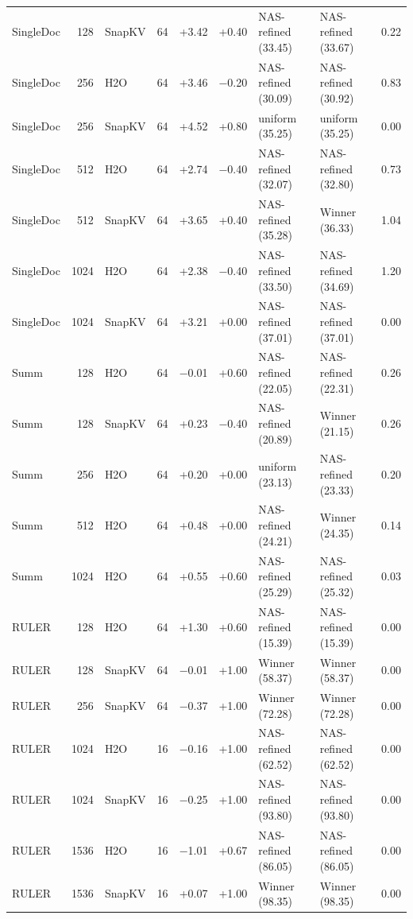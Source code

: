 \begin{table}[t]
\begin{tabular}{@{}l r l r r r l l r@{}}
    SingleDoc & 128 & SnapKV & 64 & +3.42 & +0.40 & NAS-refined (33.45) & NAS-refined (33.67) & 0.22 \\
    SingleDoc & 256 & H2O & 64 & +3.46 & $-$0.20 & NAS-refined (30.09) & NAS-refined (30.92) & 0.83 \\
    SingleDoc & 256 & SnapKV & 64 & +4.52 & +0.80 & uniform (35.25) & uniform (35.25) & 0.00 \\
    SingleDoc & 512 & H2O & 64 & +2.74 & $-$0.40 & NAS-refined (32.07) & NAS-refined (32.80) & 0.73 \\
    SingleDoc & 512 & SnapKV & 64 & +3.65 & +0.40 & NAS-refined (35.28) & Winner (36.33) & 1.04 \\
    SingleDoc & 1024 & H2O & 64 & +2.38 & $-$0.40 & NAS-refined (33.50) & NAS-refined (34.69) & 1.20 \\
    SingleDoc & 1024 & SnapKV & 64 & +3.21 & +0.00 & NAS-refined (37.01) & NAS-refined (37.01) & 0.00 \\
    Summ & 128 & H2O & 64 & $-$0.01 & +0.60 & NAS-refined (22.05) & NAS-refined (22.31) & 0.26 \\
    Summ & 128 & SnapKV & 64 & +0.23 & $-$0.40 & NAS-refined (20.89) & Winner (21.15) & 0.26 \\
    Summ & 256 & H2O & 64 & +0.20 & +0.00 & uniform (23.13) & NAS-refined (23.33) & 0.20 \\
    Summ & 512 & H2O & 64 & +0.48 & +0.00 & NAS-refined (24.21) & Winner (24.35) & 0.14 \\
    Summ & 1024 & H2O & 64 & +0.55 & +0.60 & NAS-refined (25.29) & NAS-refined (25.32) & 0.03 \\
    RULER & 128 & H2O & 64 & +1.30 & +0.60 & NAS-refined (15.39) & NAS-refined (15.39) & 0.00 \\
    RULER & 128 & SnapKV & 64 & $-$0.01 & +1.00 & Winner (58.37) & Winner (58.37) & 0.00 \\
    RULER & 256 & SnapKV & 64 & $-$0.37 & +1.00 & Winner (72.28) & Winner (72.28) & 0.00 \\
    RULER & 1024 & H2O & 16 & $-$0.16 & +1.00 & NAS-refined (62.52) & NAS-refined (62.52) & 0.00 \\
    RULER & 1024 & SnapKV & 16 & $-$0.25 & +1.00 & NAS-refined (93.80) & NAS-refined (93.80) & 0.00 \\
    RULER & 1536 & H2O & 16 & $-$1.01 & +0.67 & NAS-refined (86.05) & NAS-refined (86.05) & 0.00 \\
    RULER & 1536 & SnapKV & 16 & +0.07 & +1.00 & Winner (98.35) & Winner (98.35) & 0.00 \\

\end{tabular}
\end{table}
